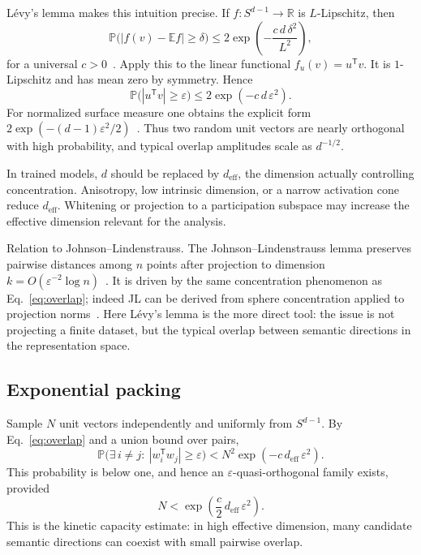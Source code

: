 \documentclass[
  aps,
  reprint,
  superscriptaddress,
  floatfix,
  nofootinbib,
  longbibliography
]{revtex4-2}
\newcommand{\R}{\mathbb{R}}
\newcommand{\E}{\mathbb{E}}
\newcommand{\Prob}{\mathbb{P}}
\newcommand{\Sph}[1]{S^{#1}}
\newcommand{\deff}{d_{\mathrm{eff}}}
\newcommand{\T}{^{\mathsf{T}}}
\begin{document}
L\'evy's lemma makes this intuition precise.  If $f:\Sph{d-1}\to\R$
is $L$-Lipschitz, then
%
\begin{equation}
\label{eq:levy}
\Prob\bigl(|f(v)-\E f|\ge\delta\bigr)
 \le
2\exp\!\left(-\frac{c\,d\,\delta^{2}}{L^{2}}\right),
\end{equation}
%
for a universal $c>0$~\cite{ledoux2001concentration,milman1986asymptotic}. Apply this to the
linear functional $f_u(v)=u\T v$. It is $1$-Lipschitz and has mean zero
by symmetry. Hence
%
\begin{equation}
\label{eq:overlap}
\Prob\bigl(|u\T v|\ge\varepsilon\bigr)
 \le 2\exp(-c\,d\,\varepsilon^{2}).
\end{equation}
%
For normalized surface measure one obtains the explicit form
$2\exp(-(d-1)\varepsilon^{2}/2)$~\cite{ledoux2001concentration}. Thus two random
unit vectors are nearly orthogonal with high probability, and typical
overlap amplitudes scale as $d^{-1/2}$.

In trained models, $d$ should be replaced by $\deff$, the dimension
actually controlling concentration. Anisotropy, low intrinsic
dimension, or a narrow activation cone reduce $\deff$. Whitening or
projection to a participation subspace may increase the effective
dimension relevant for the analysis.

{Relation to Johnson--Lindenstrauss.}
The Johnson--Lindenstrauss lemma preserves pairwise distances among
$n$ points after projection to dimension
$k=O(\varepsilon^{-2}\log n)$~\cite{johnson-1984}. It is driven by the
same concentration phenomenon as Eq.~\eqref{eq:overlap}; indeed JL can
be derived from sphere concentration applied to projection
norms~\cite{Dasgupta-2003}. Here L\'evy's lemma is the more direct tool:
the issue is not projecting a finite dataset, but the typical overlap
between semantic directions in the representation space.

\subsection{Exponential packing}
\label{sec:packing}

Sample $N$ unit vectors independently and uniformly from
$\Sph{d-1}$. By Eq.~\eqref{eq:overlap} and a union bound over pairs,
%
\begin{equation}
\label{eq:unionbound}
\Prob\bigl(\exists\,i\neq j:\ |w_i\T w_j|\ge\varepsilon\bigr)
 < N^{2}\exp(-c\,\deff\,\varepsilon^{2}).
\end{equation}
%
This probability is below one, and hence an
$\varepsilon$-quasi-orthogonal family exists, provided
%
\begin{equation}
\label{eq:packing}
N < \exp\!\left(\frac{c}{2}\,\deff\,\varepsilon^{2}\right).
\end{equation}
%
This is the kinetic capacity estimate: in high effective dimension,
many candidate semantic directions can coexist with small pairwise
overlap.
\end{document}
